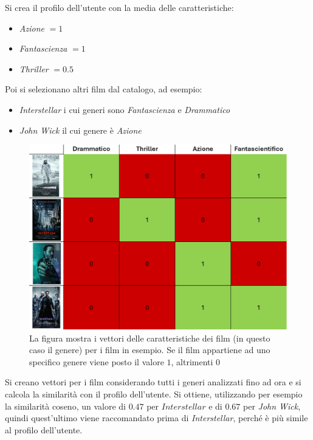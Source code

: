 Si crea il profilo dell'utente con la media delle caratteristiche: 

\begin{itemize}
    \item \textit{Azione} $= 1$
    \item \textit{Fantascienza} $= 1$
    \item \textit{Thriller} $= 0.5$
\end{itemize}

Poi si selezionano altri film dal catalogo, ad esempio:

\begin{itemize}
    \item \textit{Interstellar} i cui generi sono \textit{Fantascienza} e \textit{Drammatico}
    \item \textit{John Wick} il cui genere è \textit{Azione}
\end{itemize}

\begin{figure}[H]
    \centering
    \includegraphics[scale=0.5]{figures/content_based_filtering.PNG}
    \caption{La figura mostra i vettori delle caratteristiche dei film (in questo caso il genere) per i film in esempio. Se il film appartiene ad uno specifico genere viene posto il valore $1$, altrimenti $0$}
    \label{fig:item_vector}
\end{figure}

Si creano vettori per i film considerando tutti i generi analizzati fino ad ora e si calcola la similarità con il profilo dell'utente. Si ottiene, utilizzando per esempio la similarità coseno, un valore di $0.47$ per $Interstellar$ e di $0.67$ per \textit{John Wick}, quindi quest'ultimo viene raccomandato prima di \textit{Interstellar}, perché è più simile al profilo dell'utente.


